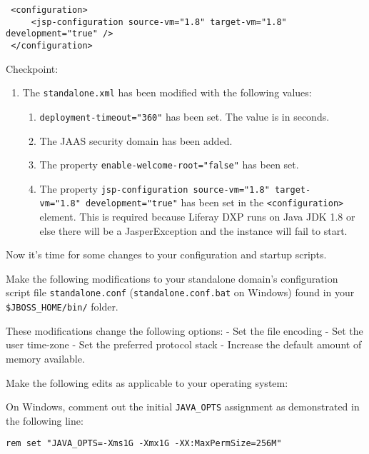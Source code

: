 \begin{enumerate}
\begin{verbatim}
 <configuration>
     <jsp-configuration source-vm="1.8" target-vm="1.8" development="true" />
 </configuration>
\end{verbatim}
\end{enumerate}

Checkpoint:

\begin{enumerate}
\def\labelenumi{\arabic{enumi}.}
\item
  The \texttt{standalone.xml} has been modified with the following
  values:

  \begin{enumerate}
  \def\labelenumii{\alph{enumii}.}
  \tightlist
  \item
    \texttt{deployment-timeout="360"} has been set. The value is in
    seconds.
  \item
    The JAAS security domain has been added.
  \item
    The property \texttt{enable-welcome-root="false"} has been set.
  \item
    The property
    \texttt{jsp-configuration\ source-vm="1.8"\ target-vm="1.8"\ development="true"}
    has been set in the \texttt{\textless{}configuration\textgreater{}}
    element. This is required because Liferay DXP runs on Java JDK 1.8
    or else there will be a JasperException and the instance will fail
    to start.
  \end{enumerate}
\end{enumerate}

Now it's time for some changes to your configuration and startup
scripts.

Make the following modifications to your standalone domain's
configuration script file \texttt{standalone.conf}
(\texttt{standalone.conf.bat} on Windows) found in your
\texttt{\$JBOSS\_HOME/bin/} folder.

These modifications change the following options: - Set the file
encoding - Set the user time-zone - Set the preferred protocol stack -
Increase the default amount of memory available.

Make the following edits as applicable to your operating system:

On Windows, comment out the initial \texttt{JAVA\_OPTS} assignment as
demonstrated in the following line:

\begin{verbatim}
rem set "JAVA_OPTS=-Xms1G -Xmx1G -XX:MaxPermSize=256M"
\end{verbatim}

